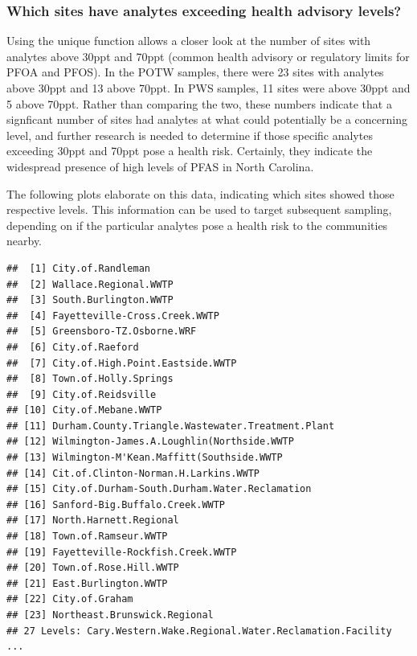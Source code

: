 \documentclass[
  12pt,
]{article}
\begin{document}
\hypertarget{which-sites-have-analytes-exceeding-health-advisory-levels}{%
\subsubsection{Which sites have analytes exceeding health advisory
levels?}\label{which-sites-have-analytes-exceeding-health-advisory-levels}}

Using the unique function allows a closer look at the number of sites
with analytes above 30ppt and 70ppt (common health advisory or
regulatory limits for PFOA and PFOS). In the POTW samples, there were 23
sites with analytes above 30ppt and 13 above 70ppt. In PWS samples, 11
sites were above 30ppt and 5 above 70ppt. Rather than comparing the two,
these numbers indicate that a signficant number of sites had analytes at
what could potentially be a concerning level, and further research is
needed to determine if those specific analytes exceeding 30ppt and 70ppt
pose a health risk. Certainly, they indicate the widespread presence of
high levels of PFAS in North Carolina.

The following plots elaborate on this data, indicating which sites
showed those respective levels. This information can be used to target
subsequent sampling, depending on if the particular analytes pose a
health risk to the communities nearby.

\begin{verbatim}
##  [1] City.of.Randleman                                
##  [2] Wallace.Regional.WWTP                            
##  [3] South.Burlington.WWTP                            
##  [4] Fayetteville-Cross.Creek.WWTP                    
##  [5] Greensboro-TZ.Osborne.WRF                        
##  [6] City.of.Raeford                                  
##  [7] City.of.High.Point.Eastside.WWTP                 
##  [8] Town.of.Holly.Springs                            
##  [9] City.of.Reidsville                               
## [10] City.of.Mebane.WWTP                              
## [11] Durham.County.Triangle.Wastewater.Treatment.Plant
## [12] Wilmington-James.A.Loughlin(Northside.WWTP       
## [13] Wilmington-M'Kean.Maffitt(Southside.WWTP         
## [14] Cit.of.Clinton-Norman.H.Larkins.WWTP             
## [15] City.of.Durham-South.Durham.Water.Reclamation    
## [16] Sanford-Big.Buffalo.Creek.WWTP                   
## [17] North.Harnett.Regional                           
## [18] Town.of.Ramseur.WWTP                             
## [19] Fayetteville-Rockfish.Creek.WWTP                 
## [20] Town.of.Rose.Hill.WWTP                           
## [21] East.Burlington.WWTP                             
## [22] City.of.Graham                                   
## [23] Northeast.Brunswick.Regional                     
## 27 Levels: Cary.Western.Wake.Regional.Water.Reclamation.Facility ...
\end{verbatim}
\end{document}
